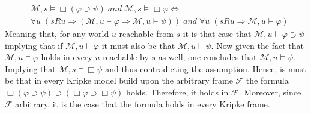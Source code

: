 \documentclass[11pt,a4paper]{article}
\newcommand{\lto}{\supset}
\newcommand{\all}{\Box}
\newcommand{\sand}{\; and \;}
\newcommand{\sor}{ \; or \;}
\newcommand{\sneg}{not \;}
\newcommand{\sto}{\Rightarrow}
\begin{document}
\begin{itemize}
\begin{equation*}
\begin{split}
&\mathcal{M},s \models \all (\varphi \lto \psi) \sand \mathcal{M},s \models \all \varphi \iff \\
&\forall u \; (sRu \sto (\mathcal{M},u \models \varphi \sto \mathcal{M},u \models \psi)) \sand \forall u \; (sRu \sto \mathcal{M},u \models \varphi)
\end{split}
\end{equation*}
Meaning that, for any world $u$ reachable from $s$ it is that case that $\mathcal{M},u \models \varphi \lto \psi$ implying that if $\mathcal{M},u \models \varphi$ it must also be that $\mathcal{M},u \models \psi$. Now given the fact that $\mathcal{M},u \models \varphi$ holds in every $u$ reachable by $s$ as well, one concludes that $\mathcal{M},u \models \psi$. Implying that $\mathcal{M},s \models \all \psi$ and thus contradicting the assumption. Hence, is must be that in every Kripke model build upon the arbitrary frame $\mathcal{F}$ the formula $\all (\varphi \lto \psi) \lto (\all \varphi \lto \all \psi)$ holds. Therefore, it holds in $\mathcal{F}$. Moreover, since $\mathcal{F}$ arbitrary, it is the case that the formula holds in every Kripke frame.
%
%
%

\end{itemize}
\end{document}
